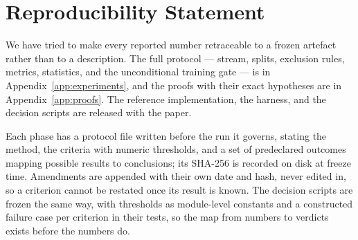 \documentclass{article}
\begin{document}
\begin{abstract}
end-to-end by $\mathbf{+11.76}$~pp, positive on every seed. The two constraints are
independent and additive. We report the method at its upper bound (the offset is
fit against the current model and family routing uses the scope at evaluation) and
state the deployment gap honestly: a stored offset goes stale ($5.08$~pp below floor,
with singleton scopes isolating the cause) and a query-batch offset inverts under a
pre-registered class-mix control ($+4.40 \to -0.67$~pp), so we report those two
sources with their measured costs and note that grouping is positioned to soften the
staleness. The one task that loses under grouping, the $14$-way DBpedia, is reported
rather than averaged away and motivates an adaptive per-family rank. Every phase was
frozen with criteria, thresholds, and predeclared outcomes before implementation and
SHA-pinned; we report the criteria that failed beside those that passed,
including amendments that correct or retract earlier claims of our own. All comparisons
are internal at matched budget and the official test files are never opened, so
our accuracies are not leaderboard-comparable and we do not present them as such.
\end{abstract}










\section*{Reproducibility Statement}
We have tried to make every reported number retraceable to a frozen artefact
rather than to a description. The full protocol --- stream, splits, exclusion
rules, metrics, statistics, and the unconditional training gate --- is in
Appendix~\ref{app:experiments}, and the proofs with their exact hypotheses are in
Appendix~\ref{app:proofs}. The reference implementation, the harness, and the
decision scripts are released with the paper.

Each phase has a protocol file written before the run it governs, stating the
method, the criteria with numeric thresholds, and a set of predeclared outcomes
mapping possible results to conclusions; its SHA-256 is recorded on disk at freeze
time. Amendments are appended with their own date and hash, never edited in, so a
criterion cannot be restated once its result is known. The decision scripts are
frozen the same way, with thresholds as module-level constants and a constructed
failure case per criterion in their tests, so the map from numbers to verdicts
exists before the numbers do.
\end{document}
